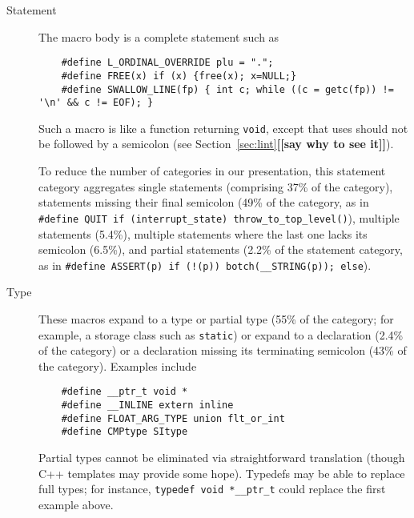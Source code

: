 \documentclass[10pt]{article}
\newcommand{\comment}[1]{\textbf{[[#1]]}}
\begin{document}
\begin{description}
\item[Statement]\label{item:statement-category}
  The macro body is a complete statement such as
\begin{verbatim}
    #define L_ORDINAL_OVERRIDE plu = ".";
    #define FREE(x) if (x) {free(x); x=NULL;}
    #define SWALLOW_LINE(fp) { int c; while ((c = getc(fp)) != '\n' && c != EOF); }
\end{verbatim}
  Such a macro is like a function returning {\tt void}, except that uses
  should not be followed by a semicolon (see
  Section~\ref{sec:lint}\comment{say why to see it}).
    
  To reduce the number of categories in our presentation, this statement
  category aggregates single statements (comprising 37\% of the category),
  statements missing their final semicolon (49\% of the category, as in
  {\tt \#define QUIT if (\verb|interrupt_state|)
  \verb|throw_to_top_level|()}), multiple statements (5.4\%), multiple
statements where the last one lacks its semicolon (6.5\%), and partial
statements (2.2\% of the statement category, as in {\tt \#define
ASSERT(p) if (!(p)) botch(\verb|__STRING|(p)); else}).

\item[Type] 
  These macros expand to a type or partial type (55\% of the category; for
  example, a storage class such as {\tt static}) or expand to a declaration
  (2.4\% of the category) or a declaration missing its terminating
  semicolon (43\% of the category).  Examples include
\begin{verbatim}
    #define __ptr_t void *
    #define __INLINE extern inline
    #define FLOAT_ARG_TYPE union flt_or_int
    #define CMPtype SItype
\end{verbatim}
  Partial types cannot be eliminated via straightforward translation
  (though C++ templates may provide some hope).  Typedefs may be able to
  replace full types; for instance, {\tt typedef void \verb|*__ptr_t|} could
  replace the first example above.



\end{description}
\end{document}
